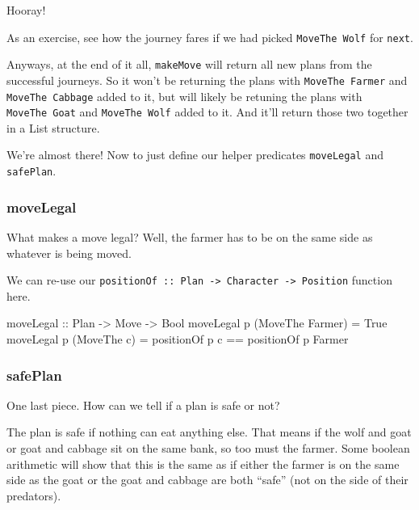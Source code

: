\documentclass[]{article}
\newenvironment{Shaded}{}{}
\newcommand{\DataTypeTok}[1]{\textcolor[rgb]{0.56,0.13,0.00}{{#1}}}
\newcommand{\OtherTok}[1]{\textcolor[rgb]{0.00,0.44,0.13}{{#1}}}
\newcommand{\FunctionTok}[1]{\textcolor[rgb]{0.02,0.16,0.49}{{#1}}}
\newcommand{\NormalTok}[1]{{#1}}
\begin{document}
Hooray!

As an exercise, see how the journey fares if we had picked
\texttt{MoveThe\ Wolf} for \texttt{next}.

Anyways, at the end of it all, \texttt{makeMove} will return all new
plans from the successful journeys. So it won't be returning the plans
with \texttt{MoveThe\ Farmer} and \texttt{MoveThe\ Cabbage} added to it,
but will likely be retuning the plans with \texttt{MoveThe\ Goat} and
\texttt{MoveThe\ Wolf} added to it. And it'll return those two together
in a List structure.

We're almost there! Now to just define our helper predicates
\texttt{moveLegal} and \texttt{safePlan}.

\subsubsection{moveLegal}\label{movelegal}

What makes a move legal? Well, the farmer has to be on the same side as
whatever is being moved.

We can re-use our
\texttt{positionOf\ ::\ Plan\ -\textgreater{}\ Character\ -\textgreater{}\ Position}
function here.

\begin{Shaded}
\begin{Highlighting}[]
\OtherTok{moveLegal ::} \DataTypeTok{Plan} \OtherTok{->} \DataTypeTok{Move} \OtherTok{->} \DataTypeTok{Bool}
\NormalTok{moveLegal p (}\DataTypeTok{MoveThe} \DataTypeTok{Farmer}\NormalTok{)  }\FunctionTok{=} \DataTypeTok{True}
\NormalTok{moveLegal p (}\DataTypeTok{MoveThe} \NormalTok{c)       }\FunctionTok{=} \NormalTok{positionOf p c }\FunctionTok{==} \NormalTok{positionOf p }\DataTypeTok{Farmer}
\end{Highlighting}
\end{Shaded}

\subsubsection{safePlan}\label{safeplan}

One last piece. How can we tell if a plan is safe or not?

The plan is safe if nothing can eat anything else. That means if the
wolf and goat or goat and cabbage sit on the same bank, so too must the
farmer. Some boolean arithmetic will show that this is the same as if
either the farmer is on the same side as the goat or the goat and
cabbage are both ``safe'' (not on the side of their predators).
\end{document}
